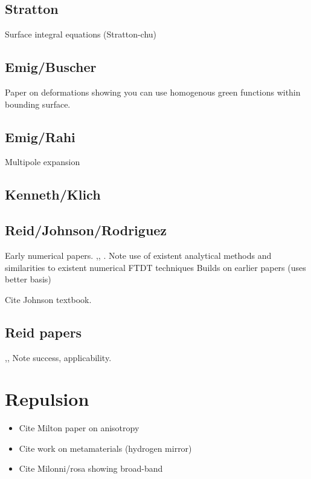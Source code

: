 \subsection{Stratton}
Surface integral equations (Stratton-chu)
\cite{Stratton1941}

\subsection{Emig/Buscher}

Paper on deformations showing you can use homogenous green functions within bounding surface.  

\subsection{Emig/Rahi}

Multipole expansion
\cite{Buscher2004}
\cite{Emig2004, Emig2007, Rahi2009}

\subsection{Kenneth/Klich}
\cite{Kenneth2006}
\cite{Kenneth2008}

\subsection{Reid/Johnson/Rodriguez}

Early numerical papers.
\cite{Rodriguez2007},\cite{Rodriguez2007a}, \cite{Rodriguez2009}.  Note use of existent analytical methods and similarities to existent numerical FTDT techniques Builds on earlier papers (uses better basis) 

Cite Johnson textbook.\cite{Johnson2011}

\subsection{Reid papers}

\cite{Reid2009},\cite{Reid2011}, \cite{Reid2013} 
Note success, applicability.  

\section{Repulsion}

\begin{itemize}
\item Cite Milton paper on anisotropy \cite{Milton2012, Milton2012a}
\item Cite work on metamaterials (hydrogen mirror)
\item Cite Milonni/rosa showing broad-band \cite{Rosa2010}
\end{itemize}

